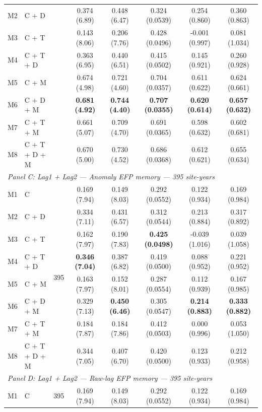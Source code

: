 \begin{table}[htbp]
\begin{tabular}{llcccccc}
M2 & C + D &  & 0.374 (6.89) & 0.448 (6.47) & 0.324 (0.0539) & 0.254 (0.860) & 0.360 (0.863) \\
M3 & C + T &  & 0.143 (8.06) & 0.206 (7.76) & 0.428 (0.0496) & -0.001 (0.997) & 0.081 (1.034) \\
M4 & C + T + D &  & 0.363 (6.95) & 0.440 (6.51) & 0.415 (0.0502) & 0.145 (0.921) & 0.260 (0.928) \\
M5 & C + M &  & 0.674 (4.98) & 0.721 (4.60) & 0.704 (0.0357) & 0.611 (0.622) & 0.624 (0.661) \\
M6 & C + D + M &  & \textbf{0.681 (4.92)} & \textbf{0.744 (4.40)} & \textbf{0.707 (0.0355)} & \textbf{0.620 (0.614)} & \textbf{0.657 (0.632)} \\
M7 & C + T + M &  & 0.661 (5.07) & 0.709 (4.70) & 0.691 (0.0365) & 0.598 (0.632) & 0.602 (0.681) \\
M8 & C + T + D + M &  & 0.670 (5.00) & 0.730 (4.52) & 0.686 (0.0368) & 0.612 (0.621) & 0.655 (0.634) \\
\midrule
\multicolumn{8}{l}{\textit{Panel C: Lag1 + Lag2 --- Anomaly EFP memory --- 395 site-years}} \\
\midrule
M1 & C & \multirow{8}{*}{395} & 0.169 (7.94) & 0.149 (8.03) & 0.292 (0.0552) & 0.122 (0.934) & 0.169 (0.984) \\
M2 & C + D &  & 0.334 (7.11) & 0.431 (6.57) & 0.312 (0.0544) & 0.213 (0.884) & 0.317 (0.892) \\
M3 & C + T &  & 0.162 (7.97) & 0.190 (7.83) & \textbf{0.425 (0.0498)} & -0.039 (1.016) & 0.039 (1.058) \\
M4 & C + T + D &  & \textbf{0.346 (7.04)} & 0.387 (6.82) & 0.419 (0.0500) & 0.088 (0.952) & 0.221 (0.952) \\
M5 & C + M &  & 0.163 (7.97) & 0.152 (8.01) & 0.287 (0.0554) & 0.112 (0.939) & 0.167 (0.985) \\
M6 & C + D + M &  & 0.329 (7.13) & \textbf{0.450 (6.46)} & 0.305 (0.0547) & \textbf{0.214 (0.883)} & \textbf{0.333 (0.882)} \\
M7 & C + T + M &  & 0.184 (7.87) & 0.184 (7.86) & 0.412 (0.0503) & 0.000 (0.996) & 0.053 (1.050) \\
M8 & C + T + D + M &  & 0.344 (7.05) & 0.407 (6.70) & 0.420 (0.0500) & 0.123 (0.933) & 0.212 (0.958) \\
\midrule
\multicolumn{8}{l}{\textit{Panel D: Lag1 + Lag2 --- Raw-lag EFP memory --- 395 site-years}} \\
\midrule
M1 & C & \multirow{8}{*}{395} & 0.169 (7.94) & 0.149 (8.03) & 0.292 (0.0552) & 0.122 (0.934) & 0.169 (0.984) \\

\end{tabular}
\end{table}
